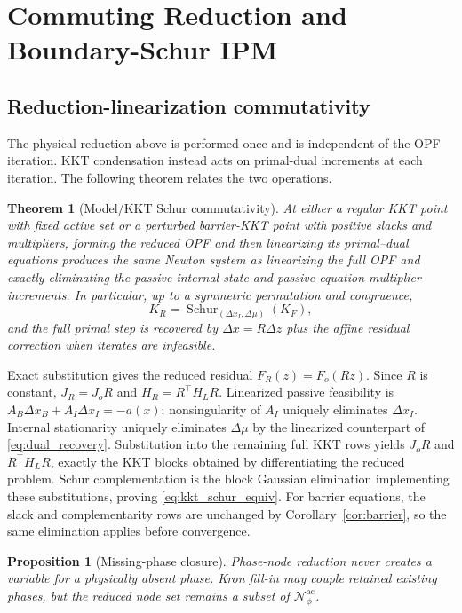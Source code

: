 \documentclass[journal,10pt]{IEEEtran}
\newcommand{\ac}{\mathrm{ac}}
\newcommand{\cN}{\mathcal{N}}
\newcommand{\Schur}{\operatorname{Schur}}
\newtheorem{theorem}{Theorem}
\newtheorem{proposition}{Proposition}
\begin{document}
\section{Commuting Reduction and Boundary-Schur IPM}
\subsection{Reduction-linearization commutativity}
The physical reduction above is performed once and is independent of the OPF
iteration.  KKT condensation instead acts on primal-dual increments at each
iteration.  The following theorem relates the two operations.

\begin{theorem}[Model/KKT Schur commutativity]\label{thm:commute}
At either a regular KKT point with fixed active set or a perturbed barrier-KKT
point with positive slacks and multipliers, forming the reduced OPF and then
linearizing its primal--dual equations produces the same Newton system as
linearizing the full OPF and exactly eliminating the passive internal state and
passive-equation multiplier increments.  In particular, up to a symmetric
permutation and congruence,
\begin{equation}
 K_R=\Schur_{(\Delta x_I,\Delta\mu)}(K_F),          \label{eq:kkt_schur_equiv}
\end{equation}
and the full primal step is recovered by $\Delta x=R\Delta z$ plus the affine
residual correction when iterates are infeasible.
\end{theorem}

\begin{IEEEproof}
Exact substitution gives the reduced residual $F_R(z)=F_o(Rz)$.  Since $R$ is
constant, $J_R=J_oR$ and $H_R=R^\top H_LR$.  Linearized passive feasibility is
$A_B\Delta x_B+A_I\Delta x_I=-a(x)$; nonsingularity of $A_I$ uniquely eliminates
$\Delta x_I$.  Internal stationarity uniquely eliminates $\Delta\mu$ by the
linearized counterpart of \eqref{eq:dual_recovery}.  Substitution into the
remaining full KKT rows yields $J_oR$ and $R^\top H_LR$, exactly the KKT blocks
obtained by differentiating the reduced problem.  Schur complementation is the
block Gaussian elimination implementing these substitutions, proving
\eqref{eq:kkt_schur_equiv}.  For barrier equations, the slack and
complementarity rows are unchanged by Corollary~\ref{cor:barrier}, so the same
elimination applies before convergence.
\end{IEEEproof}

\begin{proposition}[Missing-phase closure]\label{prop:missing}
Phase-node reduction never creates a variable for a physically absent phase.
Kron fill-in may couple retained existing phases, but the reduced node set
remains a subset of $\cN^{\ac}_{\phi}$.
\end{proposition}
\end{document}
